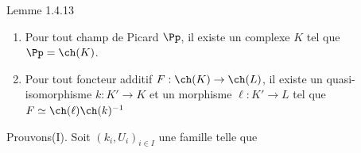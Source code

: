 \begin{enonce*}{Lemme 1.4.13}
\begin{enumerate}
\renewcommand{\theenumi}{\Roman{enumi}}
\renewcommand{\labelenumi}{(\theenumi)}
\item Pour tout champ de Picard $\Pp$, il existe un complexe
$K$ tel que $\Pp=\ch(K)$.

\item Pour tout foncteur additif $F:\ch(K)\rightarrow \ch(L)$, il
existe un quasi-isomorphisme $k:K'\rightarrow K$ et un morphisme
$\ell:K'\rightarrow L$ tel que $F\simeq \ch(\ell)\ch(k)^{-1}$
\end{enumerate}
\end{enonce*}

Prouvons\pageoriginale (I). Soit $(k_{i},U_{i})_{i\in I}$ une famille
telle que 
